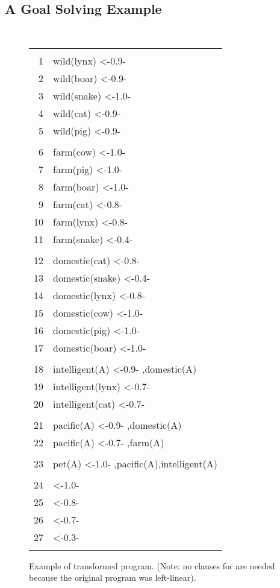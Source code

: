 \documentclass{sigplanconf}
\theoremstyle{definition}
\theoremstyle{plain}
\begin{document}
\subsection{A Goal Solving Example } \label{sec:GS}

\begin{figure}[ht]
\begin{center}
\tt
\begin{tabular}{|r@{\hspace{0.2cm}}l|}
\hline
&\\
\scriptsize  1 & wild(lynx) <-0.9- \\
\scriptsize  2 & wild(boar) <-0.9- \\
\scriptsize  3 & wild(snake) <-1.0- \\
\scriptsize  4 & wild(cat) <-0.9- \\
\scriptsize  5 & wild(pig) <-0.9- \\
&\\
\scriptsize  6 & farm(cow) <-1.0- \\
\scriptsize  7 & farm(pig) <-1.0- \\
\scriptsize  8 & farm(boar) <-1.0-  \\
\scriptsize  9 & farm(cat) <-0.8-  \\
\scriptsize 10 & farm(lynx) <-0.8-  \\
\scriptsize 11 & farm(snake) <-0.4-  \\
&\\
\scriptsize 12 & domestic(cat) <-0.8-  \\
\scriptsize 13 & domestic(snake) <-0.4-  \\
\scriptsize 14 & domestic(lynx) <-0.8-  \\
\scriptsize 15 & domestic(cow) <-1.0-  \\
\scriptsize 16 & domestic(pig) <-1.0-  \\
\scriptsize 17 & domestic(boar) <-1.0-  \\
&\\
\scriptsize 18 & intelligent(A) <-0.9- ,domestic(A) \\
\scriptsize 19 & intelligent(lynx) <-0.7-  \\
\scriptsize 20 & intelligent(cat) <-0.7-  \\
&\\
\scriptsize 21 & pacific(A) <-0.9- ,domestic(A) \\
\scriptsize 22 & pacific(A) <-0.7- ,farm(A) \\
&\\
\scriptsize 23 & pet(A) <-1.0- ,pacific(A),intelligent(A) \\
&\\
\scriptsize 24 &  <-1.0- \\
\scriptsize 25 &  <-0.8- \\
\scriptsize 26 &  <-0.7- \\
\scriptsize 27 &  <-0.3- \\
& \\
\hline
\end{tabular}
\end{center}
\caption{Example of transformed program. (Note: no clauses for  are needed because the original program was left-linear). \label{fig:exampletrans}}
\end{figure}
\end{document}
